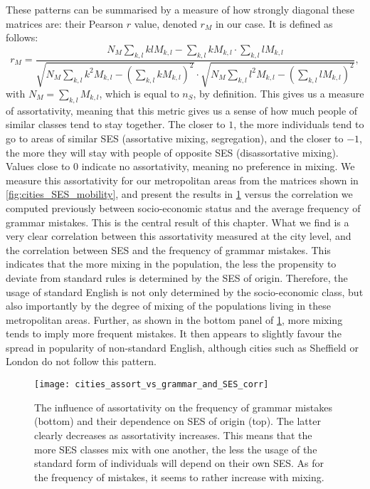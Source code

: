 \documentclass[../thesis.tex]{subfiles}
\begin{document}
These patterns can be summarised by a measure of how strongly diagonal these matrices
are: their Pearson $r$ value, denoted $r_M$ in our case. It is defined as follows:
\begin{equation}
  \label{eq:def_mobility_r}
  r_M = \frac{
    N_M \sum_{k, l} k l M_{k, l}
      - \sum_{k, l} k M_{k, l} \cdot \sum_{k, l} l M_{k, l}
    }{
      \sqrt{N_M \sum_{k, l} k^2 M_{k, l} - \left( \sum_{k, l} k M_{k, l} \right)^2}
      \cdot \sqrt{N_M \sum_{k, l} l^2 M_{k, l} - \left( \sum_{k, l} l M_{k, l} \right)^2}
    },
\end{equation}
with $N_M = \sum_{k, l} M_{k, l}$, which is equal to $n_S$, by definition.
This gives us a measure of assortativity, meaning that this metric gives us a sense of
how much people of similar classes tend to stay together. The closer to $1$, the more
individuals tend to go to areas of similar \ac{SES} (assortative mixing, segregation),
and the closer to $-1$, the more they will stay with people of opposite \ac{SES}
(disassortative mixing). Values close to $0$ indicate no assortativity, meaning no
preference in mixing. We measure this assortativity for our metropolitan areas from the
matrices shown in \cref{fig:cities_SES_mobility}, and present the results in
\cref{fig:cities_assort_vs_grammar_and_SES_corr} versus the correlation we computed
previously between socio-economic status and the average frequency of grammar mistakes.
This is the central result of this chapter. What we find is a very clear correlation
between this assortativity measured at the city level, and the correlation between
\ac{SES} and the frequency of grammar mistakes. This indicates that the more mixing in
the population, the less the propensity to deviate from standard rules is determined by
the \ac{SES} of origin. Therefore, the usage of standard English is not only determined
by the socio-economic class, but also importantly by the degree of mixing of the
populations living in these metropolitan areas. Further, as shown in the bottom panel of
\cref{fig:cities_assort_vs_grammar_and_SES_corr}, more mixing tends to imply more
frequent mistakes. It then appears to slightly favour the spread in popularity of
non-standard English, although cities such as Sheffield or London do not follow this
pattern.
\begin{figure}
\centering
  \texttt{[image: cities\_assort\_vs\_grammar\_and\_SES\_corr]}
  \caption{The influence of assortativity on the frequency of grammar mistakes (bottom)
  and their dependence on \ac{SES} of origin (top). The latter clearly decreases as
  assortativity increases. This means that the more \ac{SES} classes mix with one
  another, the less the usage of the standard form of individuals will depend on their
  own \ac{SES}. As for the frequency of mistakes, it seems to rather increase with
  mixing.}
  \label{fig:cities_assort_vs_grammar_and_SES_corr}
\end{figure}
\end{document}
